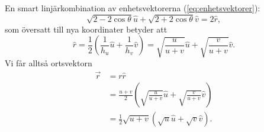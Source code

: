 \documentclass[%
oneside,                 %
final,                   %
10pt]{article}
\newenvironment{doconceexercise}{}{}
\begin{document}
\begin{doconceexercise}
En smart linjärkombination av enhetsvektorerna (\ref{eq:enhetsvektorer}):
\begin{equation}
    \sqrt{2-2\cos\theta}\hat u+\sqrt{2+2\cos\theta}\hat v=2\hat r,
\end{equation}
som översatt till nya koordinater betyder att
\begin{equation}
    \hat r=\frac12\left(\frac1{h_u}\hat u+\frac1{h_v}\hat v\right)=\sqrt{\frac u{u+v}}\hat u+\sqrt{\frac v{u+v}}\hat v.
\end{equation}
Vi får alltså ortsvektorn
\begin{align}
    \vec r&=r\hat r\nonumber\\
    &=\frac{u+v}2\left(\sqrt{\frac u{u+v}}\hat u+\sqrt{\frac v{u+v}}\hat v\right)\nonumber\\
    &=\tfrac12\sqrt{u+v} \left( \sqrt u\hat u + \sqrt v\hat v \right).
\end{align}


\end{doconceexercise}


\end{document}
